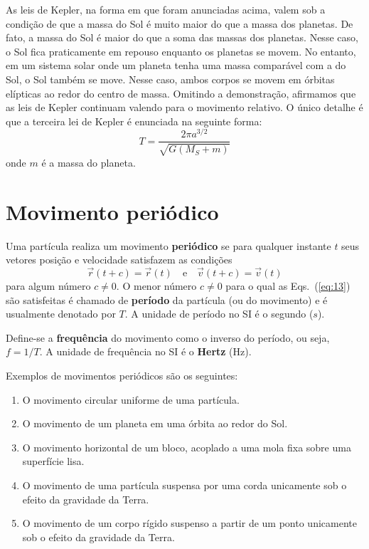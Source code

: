 \documentclass[12pt,a4paper]{article}
\theoremstyle{definition}
\begin{document}
As leis de Kepler, na forma em que foram anunciadas acima, valem sob a
condição de que a massa do Sol é muito maior do que a massa dos
planetas. De fato, a massa do Sol é maior do que a soma das massas dos
planetas. Nesse caso, o Sol fica praticamente em repouso enquanto os
planetas se movem. No entanto, em um sistema solar onde um planeta
tenha uma massa comparável com a do Sol, o Sol também se move. Nesse
caso, ambos corpos se movem em órbitas elípticas ao redor do centro de
massa. Omitindo a demonstração, afirmamos que as leis de Kepler
continuam valendo para o movimento relativo. O único detalhe é que a
terceira lei de Kepler é enunciada na seguinte forma:
$$T=\frac{2\pi a^{3/2}}{\sqrt{G(M_S+m)}}$$
onde $m$ é a massa do planeta.

\section{Movimento periódico}
Uma partícula realiza um movimento \textbf{periódico} se para qualquer
instante $t$ seus vetores posição e velocidade satisfazem as condições
\begin{equation}
  \label{eq:13}
  \vec r(t+c)=\vec r(t)\quad\text{e}\quad\vec v(t+c)=\vec v(t)
\end{equation}
para algum número $c\ne 0$. O menor número $c\ne 0$ para o qual as
Eqs.~(\ref{eq:13}) são satisfeitas é chamado de \textbf{período} da
partícula (ou do movimento) e é usualmente denotado por $T$. A unidade
de período no SI é o segundo ($s$).

Define-se a \textbf{frequência} do movimento como o inverso do
período, ou seja, $f=1/T$. A unidade de frequência no SI é o
\textbf{Hertz} ($\mathrm{Hz}$).

Exemplos de movimentos periódicos são os seguintes:
\begin{enumerate}
\item O movimento circular uniforme de uma partícula.
\item O movimento de um planeta em uma órbita ao redor do Sol.
\item O movimento horizontal de um bloco, acoplado a uma mola fixa
  sobre uma superfície lisa.
\item O movimento de uma partícula suspensa por uma corda unicamente
  sob o efeito da gravidade da Terra.
\item O movimento de um corpo rígido suspenso a partir de um ponto
  unicamente sob o efeito da gravidade da Terra.
\end{enumerate}
\end{document}
